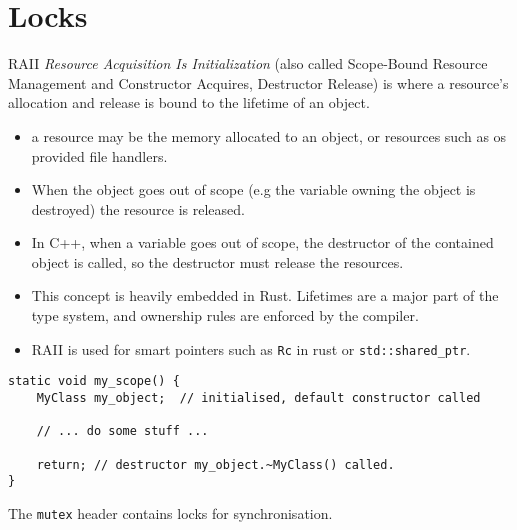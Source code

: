 \section{Locks}
\begin{definitionbox}{RAII}
	\textit{Resource Acquisition Is Initialization} (also called Scope-Bound Resource Management and Constructor Acquires, Destructor Release) is where a resource's allocation and release is bound to the lifetime of an object.
	\begin{itemize}
		\item a resource may be the memory allocated to an object, or resources such as os provided file handlers.
		\item When the object goes out of scope (e.g the variable owning the object is destroyed) the resource is released.
		\item In C++, when a variable goes out of scope, the destructor of the contained object is called, so the destructor must release the resources.
		\item This concept is heavily embedded in Rust. Lifetimes are a major part of the type system, and ownership rules are enforced by the compiler.
		\item RAII is used for smart pointers such as \texttt{Rc} in rust or \texttt{std::shared_ptr}.
	\end{itemize}
	\begin{verbatim}
static void my_scope() {
    MyClass my_object;  // initialised, default constructor called

    // ... do some stuff ...

    return; // destructor my_object.~MyClass() called. 
}
  \end{verbatim}
\end{definitionbox}
The \texttt{mutex} header contains locks for synchronisation.
